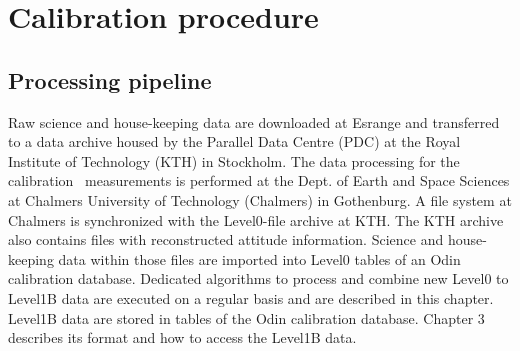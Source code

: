        
 
 
\chapter{Calibration procedure}
\label{chapter:calibration}




\section{Processing pipeline}

Raw science and house-keeping data are downloaded at
Esrange and transferred to a data archive housed by the Parallel
Data Centre (PDC) at the Royal Institute of Technology (KTH)
in Stockholm. The data processing for the calibration \smr\
measurements is performed at the Dept. of Earth and Space
Sciences at Chalmers University of Technology (Chalmers) in Gothenburg.
A file system at Chalmers is synchronized with the Level0-file archive 
at KTH. The KTH archive also contains files with reconstructed attitude
information.  Science and house-keeping data within those files
are imported into Level0 tables of an Odin calibration database. 
Dedicated algorithms to process and combine new Level0 to Level1B
data are executed on a regular basis and are described in this
chapter. Level1B data are stored in tables of the Odin calibration database.  
Chapter 3 describes its format and how to access the Level1B data.



